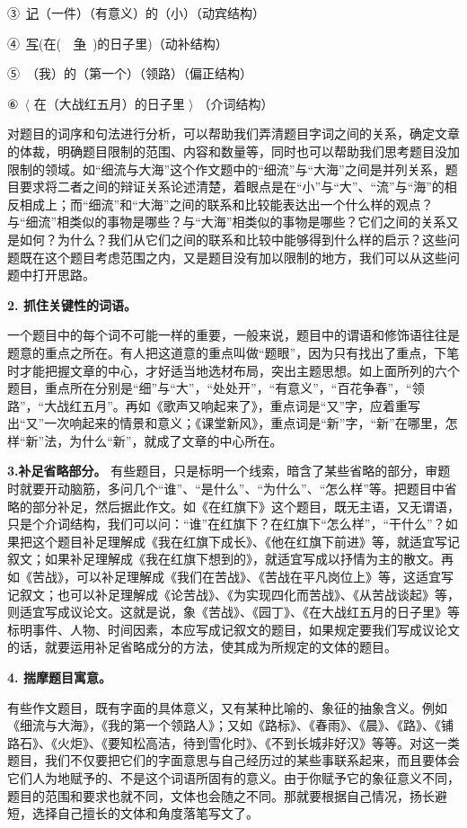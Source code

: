 ③\ \uline{记}（一件）（有意义）的（小）（动宾结构）

④\ \uline{写}(在(\ \ \uline{争}\ )的日子里)（动补结构）
\newpage

⑤\ （我）的（第一个）（领路）（偏正结构）

⑥\ $\langle$ 在（大战红五月）的日子里 $\rangle$ （介词结构）

对题目的词序和句法进行分析，可以帮助我们弄清题目字词之间的关系，确定文章的体裁，明确题目限制的范围、内容和数量等，同时也可以帮助我们思考题目没加限制的领域。如“细流与大海”这个作文题中的“细流”与“大海”之间是并列关系，题目要求将二者之间的辩证关系论述清楚，着眼点是在“小”与“大”、“流”与“海”的相反相成上；而“细流”和“大海”之间的联系和比较能表达出一个什么样的观点？与“细流”相类似的事物是哪些？与“大海”相类似的事物是哪些？它们之间的关系又是如何？为什么？我们从它们之间的联系和比较中能够得到什么样的启示？这些问题既在这个题目考虑范围之内，又是题目没有加以限制的地方，我们可以从这些问题中打开思路。

\textbf{2. 抓住关键性的词语。}

一个题目中的每个词不可能一样的重要，一般来说，题目中的谓语和修饰语往往是题意的重点之所在。有人把这道意的重点叫做“题眼”，因为只有找出了重点，下笔时才能把握文章的中心，才好适当地选材布局，突出主题思想。如上面所列的六个题目，重点所在分别是“细”与“大”，“处处开”，“有意义”，“百花争春”，“领路”，“大战红五月”。再如《歌声又响起来了》，重点词是“又”字，应着重写出“又”一次响起来的情景和意义；《课堂新风》，重点词是“新”字，“新”在哪里，怎样“新”法，为什么“新”，就成了文章的中心所在。

\textbf{3.补足省略部分。}
有些题目，只是标明一个线索，暗含了某些省略的部分，审题时就要开动脑筋，多问几个“谁”、“是什么”、“为什么”、“怎么样”等。把题目中省略的部分补足，然后据此作文。如《在红旗下》这个题目，既无主语，又无谓语，只是个介词结构，我们可以问：“谁”在红旗下？在红旗下“怎么样”，“干什么”？如果把这个题目补足理解成《我在红旗下成长》、《他在红旗下前进》等，就适宜写记叙文；如果补足理解成《我在红旗下想到的》，就适宜写成以抒情为主的散文。再如《苦战》，可以补足理解成《我们在苦战》、《苦战在平凡岗位上》等，这适宜写记叙文；也可以补足理解成《论苦战》、《为实现四化而苦战》、《从苦战谈起》等，则适宜写成议论文。这就是说，象《苦战》、《园丁》、《在大战红五月的日子里》等标明事件、人物、时间因素，本应写成记叙文的题目，如果规定要我们写成议论文的话，就要运用补足省略成分的方法，使其成为所规定的文体的题目。

\textbf{4. 揣摩题目寓意。}

有些作文题目，既有字面的具体意义，又有某种比喻的、象征的抽象含义。例如《细流与大海》，《我的第一个领路人》；又如《路标》、《春雨》、《晨》、《路》、《铺路石》、《火炬》、《要知松高洁，待到雪化时》、《不到长城非好汉》等等。对这一类题目，我们不仅要把它们的字面意思与自己经历过的某些事联系起来，而且要体会它们人为地赋予的、不是这个词语所固有的意义。由于你赋予它的象征意义不同，题目的范围和要求也就不同，文体也会随之不同。那就要根据自己情况，扬长避短，选择自己擅长的文体和角度落笔写文了。

